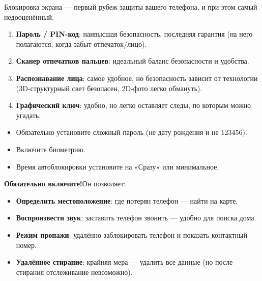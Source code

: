 


Блокировка экрана — первый рубеж защиты вашего телефона, и при этом самый недооценённый.


\begin{enumerate}
  \item \textbf{Пароль / PIN-код}: наивысшая безопасность, последняя гарантия (на него полагаются, когда забыт отпечаток/лицо).
  \item \textbf{Сканер отпечатков пальцев}: идеальный баланс безопасности и удобства.
  \item \textbf{Распознавание лица}: самое удобное, но безопасность зависит от технологии (3D-структурный свет безопасен, 2D-фото легко обмануть).
  \item \textbf{Графический ключ}: удобно, но легко оставляет следы, по которым можно угадать.
\end{enumerate}


\begin{itemize}
  \item Обязательно установите сложный пароль (не дату рождения и не 123456).
  \item Включите биометрию.
  \item Время автоблокировки установите на «Сразу» или минимальное.
\end{itemize}


\textbf{Обязательно включите!}Он позволяет:

\begin{itemize}
  \item \textbf{Определить местоположение}: где потерян телефон — найти на карте.
  \item \textbf{Воспроизвести звук}: заставить телефон звонить — удобно для поиска дома.
  \item \textbf{Режим пропажи}: удалённо заблокировать телефон и показать контактный номер.
  \item \textbf{Удалённое стирание}: крайняя мера — удалить все данные (но после стирания отслеживание невозможно).
\end{itemize}

